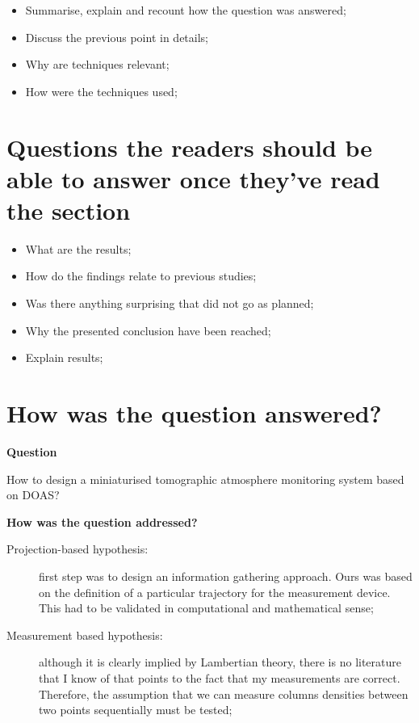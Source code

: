 \begin{itemize}
    \item Summarise, explain and recount how the question was answered;
    \item Discuss the previous point in details;
    \item Why are techniques relevant;
    \item How were the techniques used;
\end{itemize}

\section{Questions the readers should be able to answer once they've
read the section}%
\label{sec:questions_the_readers_should_be_able_to_answer_once_they_ve_read_the_section}
\begin{itemize}
    \item What are the results;
    \item How do the findings relate to previous studies;
    \item Was there anything surprising that did not go as planned;
    \item Why the presented conclusion have been reached;
    \item Explain results;
\end{itemize}


\section{How was the question answered?}%
\label{sec:how_was_the_question_answered_}
\textbf{Question}

How to design a miniaturised tomographic atmosphere monitoring system
based on DOAS?

\textbf{How was the question addressed?}

\begin{description}
    \item[Projection-based hypothesis:]first step was to design an
        information gathering approach. Ours was based on the definition
        of a particular trajectory for the measurement device. This had
        to be validated in computational and mathematical sense;
    \item[Measurement based hypothesis:] although it is clearly implied
        by Lambertian theory, there is no literature that I know of that
        points to the fact that my measurements are correct. Therefore,
        the assumption that we can measure columns densities between two
        points sequentially must be tested;
\end{description}

